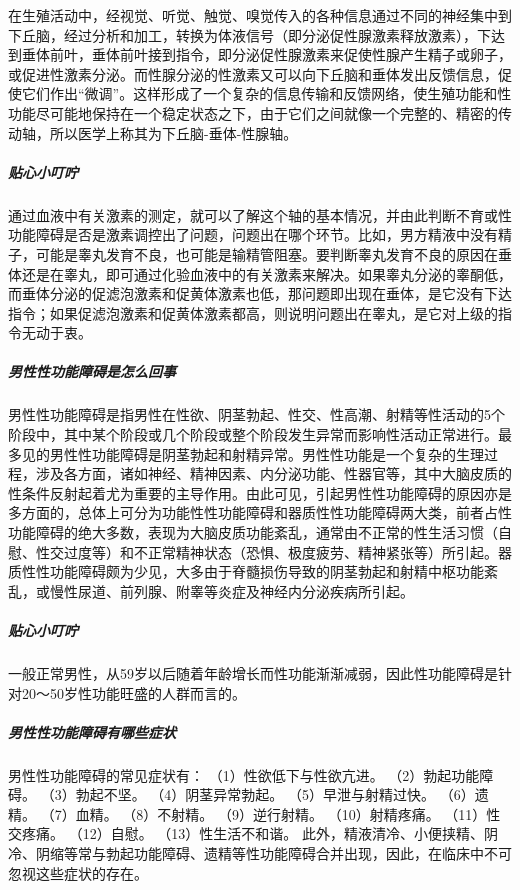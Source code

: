 在生殖活动中，经视觉、听觉、触觉、嗅觉传入的各种信息通过不同的神经集中到下丘脑，经过分析和加工，转换为体液信号（即分泌促性腺激素释放激素），下达到垂体前叶，垂体前叶接到指令，即分泌促性腺激素来促使性腺产生精子或卵子，或促进性激素分泌。而性腺分泌的性激素又可以向下丘脑和垂体发出反馈信息，促使它们作出“微调”。这样形成了一个复杂的信息传输和反馈网络，使生殖功能和性功能尽可能地保持在一个稳定状态之下，由于它们之间就像一个完整的、精密的传动轴，所以医学上称其为下丘脑-垂体-性腺轴。

\subparagraph{贴心小叮咛}

通过血液中有关激素的测定，就可以了解这个轴的基本情况，并由此判断不育或性功能障碍是否是激素调控出了问题，问题出在哪个环节。比如，男方精液中没有精子，可能是睾丸发育不良，也可能是输精管阻塞。要判断睾丸发育不良的原因在垂体还是在睾丸，即可通过化验血液中的有关激素来解决。如果睾丸分泌的睾酮低，而垂体分泌的促滤泡激素和促黄体激素也低，那问题即出现在垂体，是它没有下达指令；如果促滤泡激素和促黄体激素都高，则说明问题出在睾丸，是它对上级的指令无动于衷。

\subparagraph{男性性功能障碍是怎么回事}

男性性功能障碍是指男性在性欲、阴茎勃起、性交、性高潮、射精等性活动的5个阶段中，其中某个阶段或几个阶段或整个阶段发生异常而影响性活动正常进行。最多见的男性性功能障碍是阴茎勃起和射精异常。男性性功能是一个复杂的生理过程，涉及各方面，诸如神经、精神因素、内分泌功能、性器官等，其中大脑皮质的性条件反射起着尤为重要的主导作用。由此可见，引起男性性功能障碍的原因亦是多方面的，总体上可分为功能性性功能障碍和器质性性功能障碍两大类，前者占性功能障碍的绝大多数，表现为大脑皮质功能紊乱，通常由不正常的性生活习惯（自慰、性交过度等）和不正常精神状态（恐惧、极度疲劳、精神紧张等）所引起。器质性性功能障碍颇为少见，大多由于脊髓损伤导致的阴茎勃起和射精中枢功能紊乱，或慢性尿道、前列腺、附睾等炎症及神经内分泌疾病所引起。

\subparagraph{贴心小叮咛}

一般正常男性，从59岁以后随着年龄增长而性功能渐渐减弱，因此性功能障碍是针对20～50岁性功能旺盛的人群而言的。

\subparagraph{男性性功能障碍有哪些症状}

男性性功能障碍的常见症状有：
 （1）性欲低下与性欲亢进。
 （2）勃起功能障碍。
 （3）勃起不坚。
 （4）阴茎异常勃起。
 （5）早泄与射精过快。
 （6）遗精。
 （7）血精。
 （8）不射精。
 （9）逆行射精。
 （10）射精疼痛。
 （11）性交疼痛。
 （12）自慰。
 （13）性生活不和谐。
 此外，精液清冷、小便挟精、阴冷、阴缩等常与勃起功能障碍、遗精等性功能障碍合并出现，因此，在临床中不可忽视这些症状的存在。

